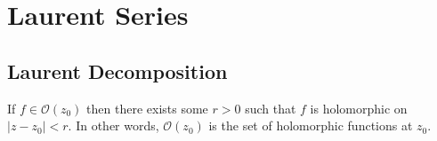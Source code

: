 %
%
%
\chapter{Laurent Series}
\label{LaurSer} %




\section{Laurent Decomposition}

\begin{definition}
    If $f \in \mathcal{O}(z_0)$ then there exists some $r > 0$ such that $f$ is holomorphic on $|z-z_0| < r$. In other words, $\mathcal{O}(z_0)$ is the set of holomorphic functions at $z_0$.
\end{definition}


